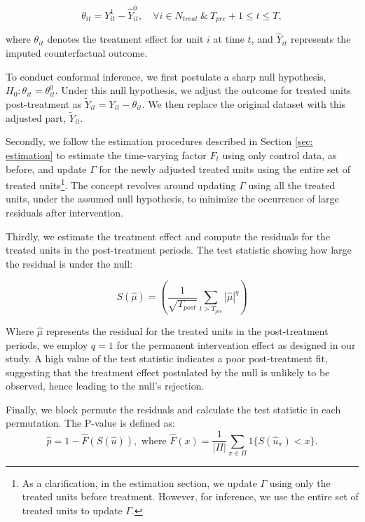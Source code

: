 \documentclass[12pt]{article}
\begin{document}
\begin{equation*}
\theta_{it} = Y^1_{it} - \hat{Y}^0_{it}, \quad \forall i \in N_{treat} \ \& \ T_{pre} + 1 \leq t \leq T,
\end{equation*}

\noindent where $\theta_{it}$ denotes the treatment effect for unit $i$ at time $t$, and $\hat{Y}_{it}$ represents the imputed counterfactual outcome. 

To conduct conformal inference, we first postulate a sharp null hypothesis, $H_0: \theta_{it} = \theta_{it}^0$. Under this null hypothesis, we adjust the outcome for treated units post-treatment as $\tilde{Y}_{it} = Y_{it} - \theta_{it}$. We then replace the original dataset with this adjusted part, $\tilde{Y}_{it}$. 

Secondly, we follow the estimation procedures described in Section \ref{sec: estimation} to estimate the time-varying factor $F_t$ using only control data, as before, and update $\Gamma$ for the newly adjusted treated units using the entire set of treated units\footnote{As a clarification, in the estimation section, we update $\Gamma$ using only the treated units before treatment. However, for inference, we use the entire set of treated units to update $\Gamma$.}. The concept revolves around updating $\Gamma$ using all the treated units, under the assumed null hypothesis, to minimize the occurrence of large residuals after intervention.

Thirdly, we estimate the treatment effect and compute the residuals for the treated units in the post-treatment periods. The test statistic showing how large the residual is under the null:

\begin{equation}
S(\hat{\mu}) = \left(\frac{1}{\sqrt{T_{post}}}\sum_{t > T_{pre}} |\hat{\mu}|^q \right)
\end{equation}

Where $\hat{\mu}$ represents the residual for the treated units in the post-treatment periods, we employ $q=1$ for the permanent intervention effect as designed in our study. A high value of the test statistic indicates a poor post-treatment fit, suggesting that the treatment effect postulated by the null is unlikely to be observed, hence leading to the null's rejection. 

Finally, we block permute the residuals and calculate the test statistic in each permutation. The P-value is defined as:
\begin{equation}
\hat{p} = 1 - \hat{F}(S(\hat{u})), \text{ where } \hat{F}(x) = \frac{1}{|\Pi|} \sum_{\pi \in \Pi} 1\{S(\hat{u}_\pi) < x\}.
\end{equation}
\end{document}
